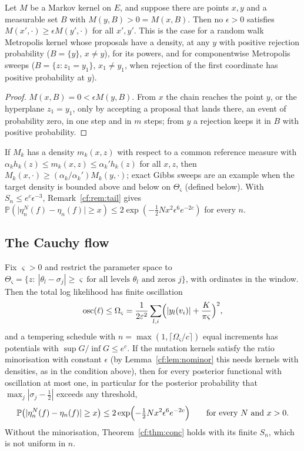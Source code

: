 \begin{lemma}\label{cf:lem:nominor}
Let $M$ be a Markov kernel on $E$, and suppose there are points $x,y$ and a measurable set $B$ with $M(y,B)>0=M(x,B)$. Then no $\epsilon>0$ satisfies $M(x',\cdot)\ge\epsilon M(y',\cdot)$ for all $x',y'$. This is the case for a random walk Metropolis kernel whose proposals have a density, at any $y$ with positive rejection probability ($B=\{y\}$, $x\ne y$), for its powers, and for componentwise Metropolis sweeps ($B=\{z:z_1=y_1\}$, $x_1\ne y_1$, when rejection of the first coordinate has positive probability at $y$).
\end{lemma}

\begin{proof}
$M(x,B)=0<\epsilon M(y,B)$. From $x$ the chain reaches the point $y$, or the hyperplane $z_1=y_1$, only by accepting a proposal that lands there, an event of probability zero, in one step and in $m$ steps; from $y$ a rejection keeps it in $B$ with positive probability.
\end{proof}

If $M_k$ has a density $m_k(x,z)$ with respect to a common reference measure with $\alpha_kh_k(z)\le m_k(x,z)\le\alpha_k'h_k(z)$ for all $x,z$, then $M_k(x,\cdot)\ge(\alpha_k/\alpha_k')M_k(y,\cdot)$; exact Gibbs sweeps are an example when the target density is bounded above and below on $\Theta_\varsigma$ (defined below). With $S_n\le e^c\epsilon^{-3}$, Remark~\ref{cf:rem:tail} gives $\mathbb P(\lvert\eta_n^N(f)-\eta_n(f)\rvert\ge x)\le2\exp(-\frac12Nx^2\epsilon^6e^{-2c})$ for every $n$.

\subsection{The Cauchy flow}

\begin{corollary}\label{cf:cor:cauchyconc}
Fix $\varsigma>0$ and restrict the parameter space to $\Theta_\varsigma=\{z:\ |\theta_l-\sigma_j|\ge\varsigma\ \text{for all levels }\theta_l\text{ and zeros }j\}$, with ordinates in the window. Then the total log likelihood has finite oscillation
\[
\operatorname{osc}(\ell)\le\Omega_\varsigma=\frac{1}{2\varepsilon^2}\sum_{l,i}\Bigl(|y_l(v_i)|+\frac{K}{\pi\varsigma}\Bigr)^2,
\]
and a tempering schedule with $n=\max(1,\lceil\Omega_\varsigma/c\rceil)$ equal increments has potentials with $\sup G/\inf G\le e^{c}$. If the mutation kernels satisfy the ratio minorisation with constant $\epsilon$ (by Lemma~\ref{cf:lem:nominor} this needs kernels with densities, as in the condition above), then for every posterior functional with oscillation at most one, in particular for the posterior probability that $\max_j|\sigma_j-\frac12|$ exceeds any threshold,
\[
\mathbb P\bigl(\lvert\eta_n^N(f)-\eta_n(f)\rvert\ge x\bigr)\le2\exp\Bigl(-\tfrac12Nx^2\epsilon^6e^{-2c}\Bigr)\qquad\text{for every }N\text{ and }x>0 .
\]
Without the minorisation, Theorem~\ref{cf:thm:conc} holds with its finite $S_n$, which is not uniform in $n$.
\end{corollary}

